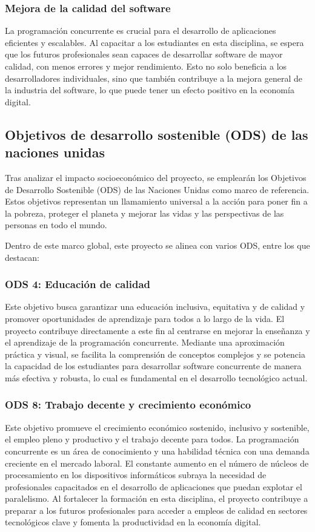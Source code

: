 \subsubsection{Mejora de la calidad del software}
La programación concurrente es crucial para el desarrollo de aplicaciones eficientes y escalables. Al capacitar a los estudiantes en esta disciplina, se espera que los futuros profesionales sean capaces de desarrollar software de mayor calidad, con menos errores y mejor rendimiento. Esto no solo beneficia a los desarrolladores individuales, sino que también contribuye a la mejora general de la industria del software, lo que puede tener un efecto positivo en la economía digital.

\subsection{Objetivos de desarrollo sostenible (ODS) de las naciones unidas}\label{subsec:ods}
Tras analizar el impacto socioeconómico del proyecto, se emplearán los Objetivos de Desarrollo Sostenible (ODS) de las Naciones Unidas \cite{ods} como marco de referencia. Estos objetivos representan un llamamiento universal a la acción para poner fin a la pobreza, proteger el planeta y mejorar las vidas y las perspectivas de las personas en todo el mundo.

Dentro de este marco global, este proyecto se alinea con varios ODS, entre los que destacan:

\subsubsection{ODS 4: Educación de calidad \cite{ods_4}}
Este objetivo busca garantizar una educación inclusiva, equitativa y de calidad y promover oportunidades de aprendizaje para todos a lo largo de la vida. El proyecto contribuye directamente a este fin al centrarse en mejorar la enseñanza y el aprendizaje de la programación concurrente. Mediante una aproximación práctica y visual, se facilita la comprensión de conceptos complejos y se potencia la capacidad de los estudiantes para desarrollar software concurrente de manera más efectiva y robusta, lo cual es fundamental en el desarrollo tecnológico actual.

\subsubsection{ODS 8: Trabajo decente y crecimiento económico \cite{ods_8}}
Este objetivo promueve el crecimiento económico sostenido, inclusivo y sostenible, el empleo pleno y productivo y el trabajo decente para todos. La programación concurrente es un área de conocimiento y una habilidad técnica con una demanda creciente en el mercado laboral. El constante aumento en el número de núcleos de procesamiento en los dispositivos informáticos subraya la necesidad de profesionales capacitados en el desarrollo de aplicaciones que puedan explotar el paralelismo. Al fortalecer la formación en esta disciplina, el proyecto contribuye a preparar a los futuros profesionales para acceder a empleos de calidad en sectores tecnológicos clave y fomenta la productividad en la economía digital.

